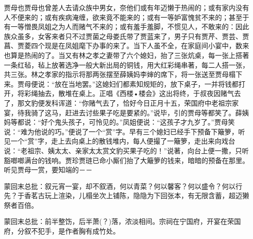 \begin{parag}


    贾母也贾母也曾差人去请众族中男女，奈他们或有年迈懒于热闹的；或有家内没有人不便来的；或有疾病淹缠，欲来竟不能来的；或有一等妒富愧贫不来的；甚至于有一等憎畏凤姐之为人而赌气不来的；或有羞手羞脚，不惯见人，不敢来的：因此族众虽多，女客来者只不过贾菌之母娄氏带了贾蓝来了，男子只有贾芹、贾芸、贾菖、贾菱四个现是在凤姐麾下办事的来了。当下人虽不全，在家庭间小宴中，数来也算是热闹的了。当又有林之孝之妻带了六个媳妇，抬了三张炕桌，每一张上搭著一条红毡，毡上放著选净一般大新出局的铜钱，用大红彩绳串著，每二人搭一张，共三张。林之孝家的指示将那两张摆至薛姨妈李婶的席下，将一张送至贾母榻下来。贾母便说：“放在当地罢。”这媳妇们都素知规矩的，放下桌子，一并将钱都打开，将彩绳抽去，散堆在桌上。正唱《西楼•楼会》这出将终，于叔夜因赌气去了，那文豹便发科诨道：“你赌气去了，恰好今日正月十五，荣国府中老祖宗家宴，待我骑了这马，赶进去讨些果子吃是要紧的。”说毕，引的贾母等都笑了。薛姨妈等都说：“好个鬼头孩子，可怜见的。”凤姐便说：“这孩子才九岁了。”贾母笑说：“难为他说的巧。”便说了一个“赏”字。早有三个媳妇已经手下预备下簸箩，听见一个“赏”字，走上去向桌上的散钱堆内，每人便撮了一簸箩，走出来向戏台说：“老祖宗、姨太太、亲家太太赏文豹买果子吃的！”说著，向台上便一撒，只听豁啷啷满台的钱响。贾珍贾琏已命小厮们抬了大簸箩的钱来，暗暗的预备在那里。听见贾母一赏，要知端的－－
\end{parag}

\begin{parag}

    \begin{note}蒙回末总批：叙元宵一宴，却不叙酒，何以青菜？何以馨客？何以盛令？何以行先？于香茗古玩上渲染，儿榻坐次上铺陈，隐隐为下回张本，有无限含蓄，超迈獭祭者百倍。\end{note}
\end{parag}


\begin{parag}


    \begin{note}蒙回末总批：前半整饬，后半萧(？)落，浓淡相间。宗祠在宁国府，开宴在荣国府，分叙不犯手，是作者胸有成竹处。\end{note}
\end{parag}
